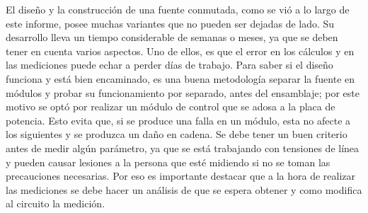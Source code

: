 \documentclass[11pt, a4paper]{article}
\begin{document}
El diseño y la construcción de una fuente conmutada, como se vió a lo largo de este informe, posee
muchas variantes que no pueden ser dejadas de lado. Su desarrollo lleva un tiempo considerable de
semanas o meses, ya que se deben tener en cuenta varios aspectos. Uno de ellos, es que el error en los
cálculos y en las mediciones puede echar a perder días de trabajo. Para saber si el diseño funciona y está
bien encaminado, es una buena metodología separar la fuente en módulos y probar su funcionamiento
por separado, antes del ensamblaje; por este motivo se optó por realizar un módulo de control que se
adosa a la placa de potencia. Esto evita que, si se produce una falla en un módulo, esta no afecte a
los siguientes y se produzca un daño en cadena. Se debe tener un buen criterio antes de medir algún
parámetro, ya que se está trabajando con tensiones de línea y pueden causar lesiones a la persona que
esté midiendo si no se toman las precauciones necesarias. Por eso es importante destacar que a la hora
de realizar las mediciones se debe hacer un análisis de que se espera obtener y como modifica al circuito
la medición.
\end{document}
